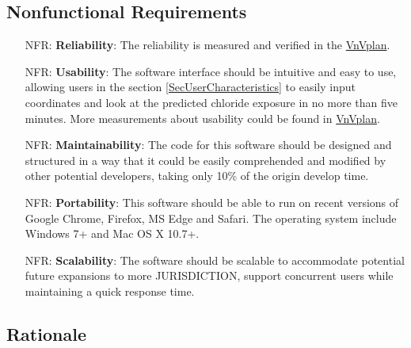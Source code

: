 \documentclass[12pt]{article}
\newcounter{nfrnum} %
\begin{document}
\subsection{Nonfunctional Requirements}

\noindent \begin{itemize}

\item[NFR\refstepcounter{nfrnum}\thenfrnum \label{NFR_Reliability}:]   \textbf{Reliability}: The reliability is measured and verified in the \href{https://github.com/CynthiaLiu0805/BridgeCorrosion/blob/main/docs/VnVPlan/VnVPlan.pdf}{VnVplan}.

\item[NFR\refstepcounter{nfrnum}\thenfrnum \label{NFR_Usability}:] \textbf{Usability}: The software interface should be intuitive and easy to use, allowing users in the section \ref{SecUserCharacteristics} to easily input coordinates and look at the predicted chloride exposure in no more than five minutes. More measurements about usability could be found in \href{https://github.com/CynthiaLiu0805/BridgeCorrosion/blob/main/docs/VnVPlan/VnVPlan.pdf}{VnVplan}.

\item[NFR\refstepcounter{nfrnum}\thenfrnum \label{NFR_Maintainability}:] \textbf{Maintainability}: The code for this software should be designed and structured in a way that it could be easily comprehended and modified by other potential developers, taking only 10\% of the origin develop time.

\item[NFR\refstepcounter{nfrnum}\thenfrnum \label{NFR_Portability}:]  \textbf{Portability}: This software should be able to run on recent versions of Google Chrome, Firefox, MS Edge and Safari. The operating system include Windows 7+ and Mac OS X 10.7+.

\item[NFR\refstepcounter{nfrnum}\thenfrnum \label{NFR_Scalability}:]   \textbf{Scalability}: The software should be scalable to accommodate potential future expansions to more JURISDICTION, support concurrent users while maintaining a quick response time.
\end{itemize}

\subsection{Rationale}
\end{document}
